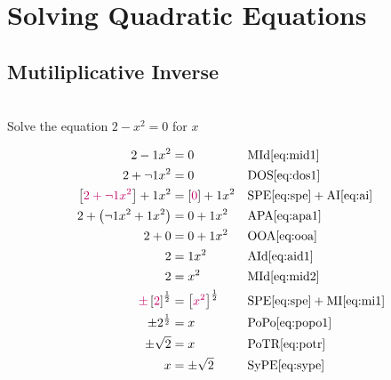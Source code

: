 \documentclass[20150903-160354-rs2.2-MarksMathNotebook.tex]{subfiles}
\begin{document}
%
%

\chapter{Solving Quadratic Equations}

\section{Mutiliplicative Inverse}
\begin{example}[id:20141107-131748] \label{20141107-131748}  \hfill \\

Solve the equation $2-x^2=0$ for $x$

\soln

\solnsteps
\begin{align*}
2-1x^2 &= 0 && \text{MId} \eqref{eq:mid1} \\
2+\neg 1 x^2 &= 0 && \text{DOS} \eqref{eq:dos1} \\
\left[\alert{2+\neg 1x^2} \right] + 1x^2 &= \left[\alert{0}\right]+ 1x^2 && \text{SPE} \eqref{eq:spe} + \text{AI} \eqref{eq:ai} \\
2 + \left(\neg 1x^2 + 1x^2 \right) &= 0 + 1x^2 && \text{APA} \eqref{eq:apa1} \\
2 + 0 &= 0 + 1x^2 && \text{OOA} \eqref{eq:ooa} \\
2 &= 1x^2 && \text{AId} \eqref{eq:aid1} \\
2 &= x^2 && \text{MId} \eqref{eq:mid2} \\
\alert{\pm} \left[\alert{2} \right]^{\frac{1}{2}} &= \left[\alert{x^2}\right]^{\frac{1}{2}} && \text{SPE} \eqref{eq:spe} + \text{MI} \eqref{eq:mi1} \\
\pm 2^{\frac{1}{2}} &= x && \text{PoPo} \eqref{eq:popo1} \\
\pm \sqrt{2} &= x && \text{PoTR} \eqref{eq:potr} \\
x &= \pm \sqrt{2} && \text{SyPE} \eqref{eq:sype}
\end{align*}
\end{example}
\end{document}
